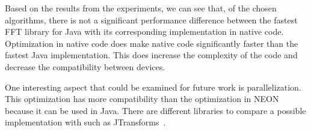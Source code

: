 Based on the results from the experiments, we can see that, of the chosen algorithms, there is not a significant performance difference between the fastest FFT library for Java with its corresponding implementation in native code. Optimization in native code does make native code significantly faster than the fastest Java implementation. This does increase the complexity of the code and decrease the compatibility between devices.

One interesting aspect that could be examined for future work is parallelization. This optimization has more compatibility than the optimization in NEON because it can be used in Java. There are different libraries to compare a possible implementation with such as JTransforms~\cite{jtransforms:benchmark}.
